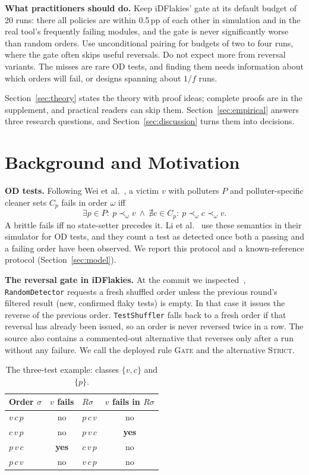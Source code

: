\documentclass[conference,letterpaper]{IEEEtran}
\theoremstyle{definition}
\newcommand{\pp}{\,pp}
\newcommand{\GATEp}{\textup{\textsc{Gate}}}
\newcommand{\STRICTp}{\textup{\textsc{Strict}}}
\begin{document}
\textbf{What practitioners should do.} Keep iDFlakies' gate at its default budget of 20 runs: there all policies are within 0.5\pp{} of each other in simulation and in the real tool's frequently failing modules, and the gate is never significantly worse than random orders. Use unconditional pairing for budgets of two to four runs, where the gate often skips useful reversals. Do not expect more from reversal variants. The misses are rare OD tests, and finding them needs information about which orders will fail, or designs spanning about $1/f$ runs.

Section~\ref{sec:theory} states the theory with proof ideas; complete proofs are in the supplement, and practical readers can skip them. Section~\ref{sec:empirical} answers three research questions, and Section~\ref{sec:discussion} turns them into decisions.

\section{Background and Motivation}\label{sec:background}
\textbf{OD tests.} Following Wei et al.~\cite{wei2021tacas}, a victim $v$ with polluters $P$ and polluter-specific cleaner sets $C_p$ fails in order $\omega$ iff
\begin{equation}\label{eq:def1}
\exists p\in P:\ p\prec_\omega v \ \wedge\ \nexists c\in C_p:\ p\prec_\omega c\prec_\omega v .
\end{equation}
A brittle fails iff no state-setter precedes it. Li et al.~\cite{li2023issta} use these semantics in their simulator for \NTargets{} OD tests, and they count a test as detected once both a passing and a failing order have been observed. We report this protocol and a known-reference protocol (Section~\ref{sec:model}).

\textbf{The reversal gate in iDFlakies.} At the commit we inspected~\cite{idflakiesrepo}, \texttt{RandomDetector} requests a fresh shuffled order unless the previous round's filtered result (new, confirmed flaky tests) is empty. In that case it issues the reverse of the previous order. \texttt{TestShuffler} falls back to a fresh order if that reversal has already been issued, so an order is never reversed twice in a row. The source also contains a commented-out alternative that reverses only after a run without any failure. We call the deployed rule \GATEp{} and the alternative \STRICTp{}.

\begin{table}[t]
\caption{The three-test example: classes $\{v,c\}$ and $\{p\}$.}\label{tab:example}
\centering\small
\begin{tabular}{@{}lclc@{}}
\toprule
Order $\sigma$ & $v$ fails & $R\sigma$ & $v$ fails in $R\sigma$\\
\midrule
$v\,c\,p$ & no & $p\,c\,v$ & no\\
$c\,v\,p$ & no & $p\,v\,c$ & \textbf{yes}\\
$p\,v\,c$ & \textbf{yes} & $c\,v\,p$ & no\\
$p\,c\,v$ & no & $v\,c\,p$ & no\\
\bottomrule
\end{tabular}
\end{table}
\end{document}
